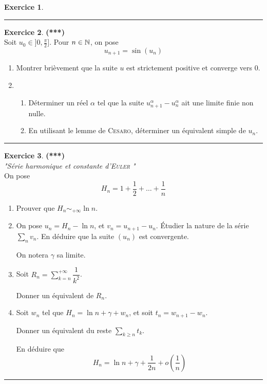 \documentclass[a4paper,11pt]{article}
\theoremstyle{definition}
\newtheorem{exo}{Exercice} %
\begin{document}
\begin{minipage}{1\linewidth}
\begin{minipage}[t]{0.48\linewidth}
\begin{exo}
			
			\centering
			\rule{1\linewidth}{0.6pt}
		\end{exo}
		
		\begin{exo}\textbf{(***)}\quad\\[0.2cm]
			Soit $u_0\in]0,\frac{\pi}{2}]$. Pour $n\in\mathbb{N}$, on pose 
			$$u_{n+1}=\sin(u_n)$$
			\begin{enumerate}
				\item  Montrer brièvement que la suite $u$ est strictement positive et converge vers $0$.
				\item 
				\begin{enumerate}
					\item Déterminer un réel $\alpha$ tel que la suite $u_{n+1}^\alpha-u_n^\alpha$ ait une limite finie non nulle.
					\item En utilisant le lemme de \textsc{Cesaro}, déterminer un équivalent simple de $u_n$.
					
				\end{enumerate}
			\end{enumerate}
			\centering
			\rule{1\linewidth}{0.6pt}
		\end{exo}
		
		
		\begin{exo}\textbf{(***)}\quad \\[0.2cm]
			\textit{"Série harmonique et constante d'\textsc{Euler} "}\\[0.2cm]
			On pose $$\displaystyle H_n=1+\frac12+\dots+\frac1n$$ 
			\begin{enumerate}
				\item Prouver que $\displaystyle H_n\sim_{+\infty}\ln n$.
				\item On pose $\displaystyle u_n=H_n-\ln n$, et $\displaystyle v_n=u_{n+1}-u_n$.
				\'Etudier la nature de la série $\displaystyle \sum_n v_n$. En déduire que la suite $(u_n)$ est convergente. 
				
				On notera $\displaystyle \gamma$ sa limite.
				\item Soit $\displaystyle R_n=\sum\limits_{k=n}^{+\infty} \dfrac{1}{k^2}$.
				
				Donner un équivalent de $R_n$.
				\item Soit $w_n$ tel que $\displaystyle H_n=\ln n+\gamma+w_n$, et soit 
				$t_n=w_{n+1}-w_n$. 
				
				Donner un équivalent du reste $\displaystyle \sum\limits_{k\geq n}t_k$.
				
				En déduire que $$\displaystyle H_n=\ln n+\gamma+\frac{1}{2n}+o\left(\frac1n\right)$$
			\end{enumerate}
	
			\centering
			\rule{1\linewidth}{0.6pt}
		\end{exo}

		
		
	\end{minipage}
\end{minipage}
	
\end{document}
